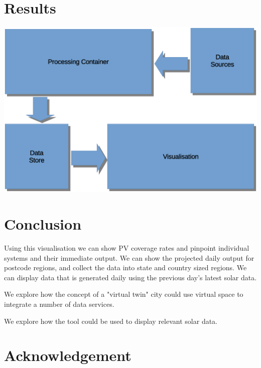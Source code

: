 \documentclass[10pt, a4paper]{article}
\begin{document}
\begin{multicols}{2}
\section{Results}

\includegraphics[scale=0.17]{design1.eps}

\section{Conclusion}

Using this visualisation we can show PV coverage rates and pinpoint individual systems and their immediate output. We can show the projected daily output for postcode regions, and collect the data into state and country sized regions. We can display data that is generated daily using the previous day's latest solar data. 

We explore how the concept of a "virtual twin" city could use virtual space to integrate a number of data services.

We explore how the tool could be used to display relevant solar data.

\section*{Acknowledgement}


%
\end{multicols}
\end{document}
